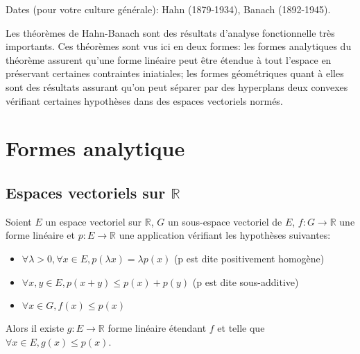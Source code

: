 Dates (pour votre culture générale): Hahn (1879-1934), Banach (1892-1945).

Les théorèmes de Hahn-Banach sont des résultats d'analyse fonctionnelle
très importants. Ces théorèmes sont vus ici en deux formes:
les formes analytiques du théorème assurent qu'une forme linéaire
peut être étendue à tout l'espace en préservant certaines contraintes
iniatiales; les formes géométriques quant à elles sont des résultats
assurant qu'on peut séparer par des hyperplans deux convexes vérifiant
certaines hypothèses dans des espaces vectoriels normés.

\section{Formes analytique}
\subsection{Espaces vectoriels sur $\mathbb{R}$}

\begin{thm} \label{hb:a1}
Soient $E$ un espace vectoriel sur $\mathbb{R}$, $G$ un sous-espace
vectoriel de $E$, $f: G \to \mathbb{R}$ une forme linéaire
et $p: E\to \mathbb{R}$ une application vérifiant les hypothèses suivantes:
\begin{itemize}
\item $\forall\lambda >0, \forall x \in E, p(\lambda x)=\lambda p(x)$
  (p est dite positivement homogène)
\item $\forall x,y \in E, p(x+y)\leq p(x)+p(y)$
  (p est dite sous-additive)
\item$\forall x\in G, f(x)\leq p(x)$
\end{itemize}
Alors il existe $g:E\to\mathbb{R}$ forme linéaire étendant $f$ et telle
que $\forall x \in E, g(x)\leq p(x)$.
\end{thm}

